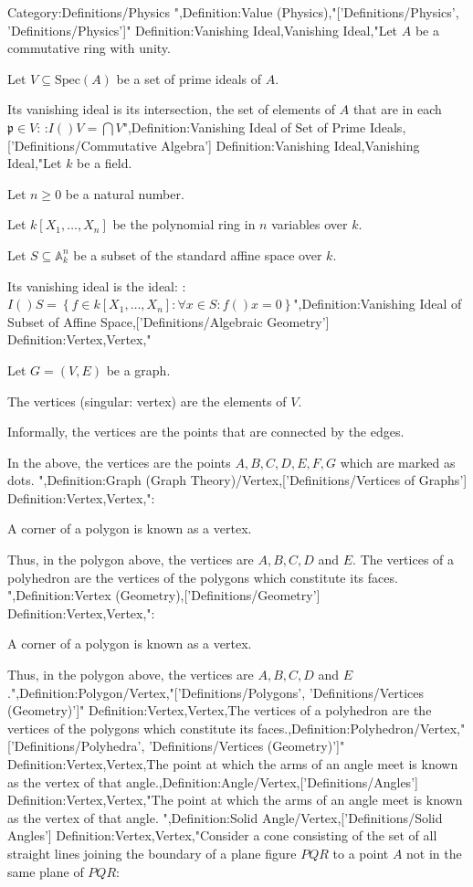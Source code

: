 Category:Definitions/Physics
",Definition:Value (Physics),"['Definitions/Physics', 'Definitions/Physics']"
Definition:Vanishing Ideal,Vanishing Ideal,"Let $A$ be a commutative ring with unity.

Let $V \subseteq \mathrm {Spec} \left( A \right)$ be a set of prime ideals of $A$.


Its vanishing ideal is its intersection, the set of elements of $A$ that are in each $\mathfrak p \in V$:
:$I \left(   \right)V = \bigcap V$",Definition:Vanishing Ideal of Set of Prime Ideals,['Definitions/Commutative Algebra']
Definition:Vanishing Ideal,Vanishing Ideal,"Let $k$ be a field.

Let $n \ge 0$ be a natural number.

Let $k \left[ X_1, \ldots, X_n \right]$ be the polynomial ring in $n$ variables over $k$.

Let $S \subseteq \mathbb A^n_k$ be a subset of the standard affine space over $k$.


Its vanishing ideal is the ideal:
:$I \left(   \right)S = \left\lbrace f \in k \left[ X_1, \ldots, X_n \right] : \forall x \in S : f \left(   \right)x = 0 \right\rbrace$",Definition:Vanishing Ideal of Subset of Affine Space,['Definitions/Algebraic Geometry']
Definition:Vertex,Vertex,"

Let $G = \left( V, E \right)$ be a graph.

The vertices (singular: vertex) are the elements of $V$.

Informally, the vertices are the points that are connected by the edges.


In the above, the vertices are the points $A, B, C, D, E, F, G$ which are marked as dots.
",Definition:Graph (Graph Theory)/Vertex,['Definitions/Vertices of Graphs']
Definition:Vertex,Vertex,":

A corner of a polygon is known as a vertex.

Thus, in the polygon above, the vertices are $A, B, C, D$ and $E$.
The vertices of a polyhedron are the vertices of the polygons which constitute its faces.
",Definition:Vertex (Geometry),['Definitions/Geometry']
Definition:Vertex,Vertex,":

A corner of a polygon is known as a vertex.

Thus, in the polygon above, the vertices are $A, B, C, D$ and $E$.",Definition:Polygon/Vertex,"['Definitions/Polygons', 'Definitions/Vertices (Geometry)']"
Definition:Vertex,Vertex,The vertices of a polyhedron are the vertices of the polygons which constitute its faces.,Definition:Polyhedron/Vertex,"['Definitions/Polyhedra', 'Definitions/Vertices (Geometry)']"
Definition:Vertex,Vertex,The point at which the arms of an angle meet is known as the vertex of that angle.,Definition:Angle/Vertex,['Definitions/Angles']
Definition:Vertex,Vertex,"The point at which the arms of an angle meet is known as the vertex of that angle.
",Definition:Solid Angle/Vertex,['Definitions/Solid Angles']
Definition:Vertex,Vertex,"Consider a cone consisting of the set of all straight lines joining the boundary of a plane figure $PQR$ to a point $A$ not in the same plane of $PQR$:


